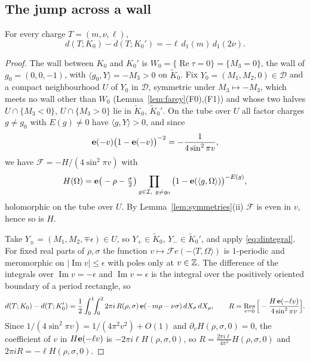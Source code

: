 \subsection{The jump across a wall}

\begin{lemma}\label{lem:jump}
For every charge $T=(m,\nu,\ell)$,
\[
d(T;K_0)-d(T;K_0')=-\ell\,d_1(m)\,d_1(2\nu).
\]
\end{lemma}

\begin{proof}
The wall between $K_0$ and $K_0'$ is $W_0=\{\operatorname{Re}\tau=0\}=\{M_3=0\}$, the wall of $g_0=(0,0,-1)$, with $\langle g_0,Y\rangle=-M_3>0$ on $\tilde K_0$. Fix $Y_0=(M_1,M_2,0)\in\mathcal D$ and a compact neighbourhood $U$ of $Y_0$ in $\mathcal D$, symmetric under $M_3\mapsto-M_3$, which meets no wall other than $W_0$ (Lemma~\ref{lem:farey}(F0),(F1)) and whose two halves $U\cap\{M_3<0\}$, $U\cap\{M_3>0\}$ lie in $\tilde K_0$, $\tilde K_0'$. On the tube over $U$ all factor charges $g\ne g_0$ with $E(g)\ne0$ have $\langle g,Y\rangle>0$, and since
\[
\mathbf e(-v)\big(1-\mathbf e(-v)\big)^{-2}=-\frac1{4\sin^2\pi v},
\]
we have $\mathcal F=-H/(4\sin^2\pi v)$ with
\[
H(\Omega)=\mathbf e\big(-\rho-\tfrac\sigma2\big)\prod_{g\in\mathcal I,\ g\ne g_0}\big(1-\mathbf e(\langle g,\Omega\rangle)\big)^{-E(g)},
\]
holomorphic on the tube over $U$. By Lemma~\ref{lem:symmetries}(ii) $\mathcal F$ is even in $v$, hence so is $H$.

Take $Y_\pm=(M_1,M_2,\mp\epsilon)\in U$, so $Y_+\in\tilde K_0$, $Y_-\in\tilde K_0'$, and apply \eqref{eq:dintegral}. For fixed real parts of $\rho,\sigma$ the function $v\mapsto\mathcal F e(-\langle T,\Omega\rangle)$ is $1$-periodic and meromorphic on $|\operatorname{Im}v|\le\epsilon$ with poles only at $v\in\mathbb{Z}$. The difference of the integrals over $\operatorname{Im}v=-\epsilon$ and $\operatorname{Im}v=\epsilon$ is the integral over the positively oriented boundary of a period rectangle, so
\[
d(T;K_0)-d(T;K_0')=\frac12\int_0^1\!\!\int_0^2 2\pi i\,R(\rho,\sigma)\,\mathbf e(-m\rho-\nu\sigma)\,dX_\sigma\,dX_\rho,\qquad R=\operatorname*{Res}_{v=0}\Big[-\frac{H\,\mathbf e(-\ell v)}{4\sin^2\pi v}\Big].
\]
Since $1/(4\sin^2\pi v)=1/(4\pi^2v^2)+O(1)$ and $\partial_vH(\rho,\sigma,0)=0$, the coefficient of $v$ in $H\mathbf e(-\ell v)$ is $-2\pi i\ell H(\rho,\sigma,0)$, so $R=\frac{2\pi i\ell}{4\pi^2}H(\rho,\sigma,0)$ and $2\pi iR=-\ell H(\rho,\sigma,0)$.


\end{proof}
